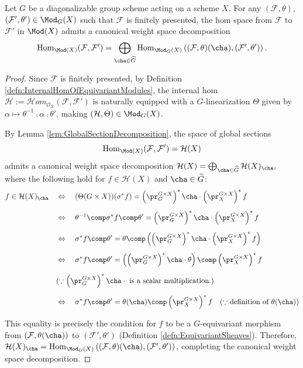 \begin{prop}
\label{prop:WeightSpaceDecompositionOfHomSpace}
Let $G$ be a diagonalizable group scheme acting on a scheme $X$.
For any
$(\mathcal{F}, \theta)$,
$(\mathcal{F}', \theta') \in \Mod_G(X)$
such that
$\mathcal{F}$
is finitely presented,
the hom space from $\mathcal{F}$ to $\mathcal{F}'$
in $\Mod(X)$
admits a canonical weight space decomposition
$$
\operatorname{Hom}_{\Mod(X)}(\mathcal{F}, \mathcal{F}') 
= 
\bigoplus_{\cha \in \widehat{G}} \operatorname{Hom}_{\Mod_G(X)}\left( (\mathcal{F}, \theta)(\cha), (\mathcal{F}', \theta') \right).
$$
\end{prop}
\begin{proof}
Since $\mathcal{F}$ is finitely presented,
by Definition \ref{defn:InternalHomOfEquivariantModules}, 
the internal hom $\mathcal{H} := \mathcal{H}om_{\mathcal{O}_X}(\mathcal{F}, \mathcal{F}')$ is naturally equipped with a $G$-linearization $\Theta$ given by $\alpha \mapsto \theta^{-1} \comp \alpha \comp \theta'$, making $(\mathcal{H}, \Theta) \in \Mod_G(X)$.

By Lemma \ref{lem:GlobalSectionDecomposition},
the space of global sections
$$
\operatorname{Hom}_{\Mod(X)}(\mathcal{F}, \mathcal{F}')
=
\mathcal{H}(X)
$$
admits a canonical weight space decomposition
$
\mathcal{H}(X)
=
\bigoplus_{\cha \in \widehat{G}} \mathcal{H}(X)_{\cha},
$
where
the following hold
for $f\in\mathcal{H}(X)$ and $\cha\in\widehat{G}$:
\begin{align*}
f\in \mathcal{H}(X)_{\cha}
\quad
&\Leftrightarrow
\quad
(\Theta(G\times X))(\sigma^* f)
=
\left(\pr_G^{G \times X}\right)^*\cha
\cdot
\left(\pr_X^{G \times X}\right)^* f
\\[2mm]
&\Leftrightarrow
\quad
\theta^{-1} \comp \sigma^* f \comp \theta' = \left(\pr_G^{G \times X}\right)^*\cha \cdot \left(\pr_X^{G \times X}\right)^* f
\\[2mm]
&\Leftrightarrow
\quad
\sigma^* f \comp \theta' = \theta \comp \left( \left(\pr_G^{G \times X}\right)^*\cha \cdot \left(\pr_X^{G \times X}\right)^* f \right)
\\[2mm]
&\Leftrightarrow
\quad
\sigma^* f \comp \theta' = \left( \left(\pr_G^{G \times X}\right)^*\cha \cdot \theta \right) \comp \left(\pr_X^{G \times X}\right)^* f\\[2mm]
&(\because \left(\pr_G^{G \times X}\right)^*\cha \cdot\text{ is a scalar multiplication.})
\\[2mm]
&\Leftrightarrow
\quad
\sigma^* f \comp \theta' = \theta(\cha) \comp \left(\pr_X^{G \times X}\right)^* f
\quad(\because \text{definition of $\theta(\cha)$})
\end{align*}

This equality is precisely the condition for $f$ to be a $G$-equivariant morphism from
$(\mathcal{F}, \theta(\cha))$
to
$(\mathcal{F}', \theta')$
(Definition \ref{defn:EquivariantSheaves}). 
Therefore, $\mathcal{H}(X)_{\cha} = \operatorname{Hom}_{\Mod_G(X)}\left( (\mathcal{F}, \theta)(\cha), (\mathcal{F}', \theta') \right)$, completing the canonical weight space decomposition.
\end{proof}
